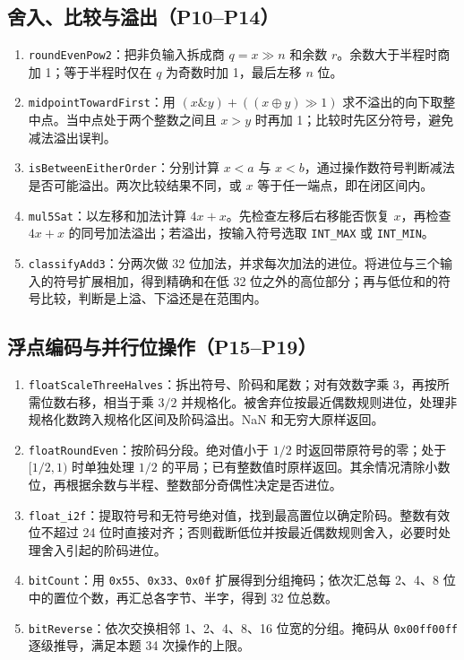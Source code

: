 \documentclass[UTF8,a4paper,11pt]{ctexart}
\begin{document}
\subsection{舍入、比较与溢出（P10--P14）}
\begin{enumerate}[label=\textbf{P\arabic*.},start=10]
  \item \texttt{roundEvenPow2}：把非负输入拆成商 \(q=x\gg n\) 和余数 \(r\)。余数大于半程时商加 1；等于半程时仅在 \(q\) 为奇数时加 1，最后左移 \(n\) 位。
  \item \texttt{midpointTowardFirst}：用 \((x\mathbin{\&}y)+((x\mathbin{\oplus}y)\gg1)\) 求不溢出的向下取整中点。当中点处于两个整数之间且 \(x>y\) 时再加 1；比较时先区分符号，避免减法溢出误判。
  \item \texttt{isBetweenEitherOrder}：分别计算 \(x<a\) 与 \(x<b\)，通过操作数符号判断减法是否可能溢出。两次比较结果不同，或 \(x\) 等于任一端点，即在闭区间内。
  \item \texttt{mul5Sat}：以左移和加法计算 \(4x+x\)。先检查左移后右移能否恢复 \(x\)，再检查 \(4x+x\) 的同号加法溢出；若溢出，按输入符号选取 \texttt{INT\_MAX} 或 \texttt{INT\_MIN}。
  \item \texttt{classifyAdd3}：分两次做 32 位加法，并求每次加法的进位。将进位与三个输入的符号扩展相加，得到精确和在低 32 位之外的高位部分；再与低位和的符号比较，判断是上溢、下溢还是在范围内。
\end{enumerate}

\subsection{浮点编码与并行位操作（P15--P19）}
\begin{enumerate}[label=\textbf{P\arabic*.},start=15]
  \item \texttt{floatScaleThreeHalves}：拆出符号、阶码和尾数；对有效数字乘 3，再按所需位数右移，相当于乘 \(3/2\) 并规格化。被舍弃位按最近偶数规则进位，处理非规格化数跨入规格化区间及阶码溢出。NaN 和无穷大原样返回。
  \item \texttt{floatRoundEven}：按阶码分段。绝对值小于 \(1/2\) 时返回带原符号的零；处于 \([1/2,1)\) 时单独处理 \(1/2\) 的平局；已有整数值时原样返回。其余情况清除小数位，再根据余数与半程、整数部分奇偶性决定是否进位。
  \item \texttt{float\_i2f}：提取符号和无符号绝对值，找到最高置位以确定阶码。整数有效位不超过 24 位时直接对齐；否则截断低位并按最近偶数规则舍入，必要时处理舍入引起的阶码进位。
  \item \texttt{bitCount}：用 \texttt{0x55}、\texttt{0x33}、\texttt{0x0f} 扩展得到分组掩码；依次汇总每 2、4、8 位中的置位个数，再汇总各字节、半字，得到 32 位总数。
  \item \texttt{bitReverse}：依次交换相邻 1、2、4、8、16 位宽的分组。掩码从 \texttt{0x00ff00ff} 逐级推导，满足本题 34 次操作的上限。
\end{enumerate}
\end{document}
